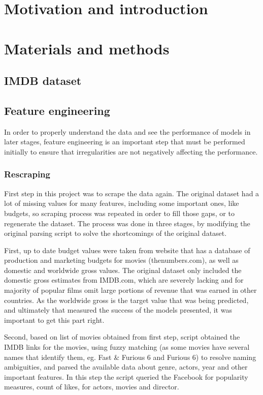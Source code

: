 \section{Motivation and introduction}
\blindtext[1]
\section{Materials and methods}
\blindtext[1]
\subsection{IMDB dataset}
\blindtext[1]
\subsection{Feature engineering}
In order to properly understand the data and see the performance of models in later stages, feature engineering is an important step that must be performed initially to ensure that irregularities are not negatively affecting the performance.
\subsubsection{Rescraping}
First step in this project was to scrape the data again. The original dataset had a lot of missing values for many features, including some important ones, like budgets, so scraping process was  repeated in order to fill those gaps, or to regenerate the dataset. The process was done in three stages, by modifying the original parsing script to solve the shortcomings of the original dataset. 

First, up to date budget values were taken from website that has a database of production and marketing budgets for movies (thenumbers.com), as well as domestic and worldwide gross values. The original dataset only included the domestic gross estimates from IMDB.com, which are severely lacking and for majority of popular films omit large portions of revenue that was earned in other countries. As the worldwide gross is the target value that was being predicted, and ultimately that measured the success of the models presented, it was important to get this part right.

Second, based on list of movies obtained from first step, script obtained the IMDB links for the movies, using fuzzy matching (as some movies have several names that identify them, eg. Fast \& Furious 6 and Furious 6) to resolve naming ambiguities, and parsed the available data about genre, actors, year and other important features. In this step the script queried the Facebook for popularity measures, count of likes, for actors, movies and director.

